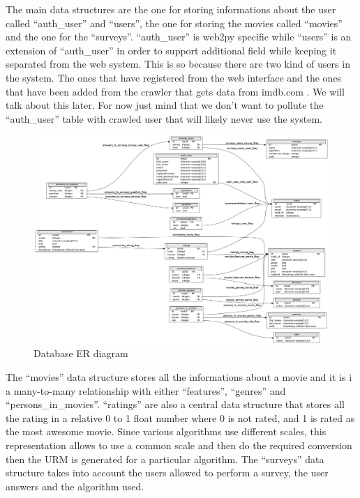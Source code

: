 The main data structures are the one for storing informations about the user called ``auth\_user'' and ``users'', the one for storing the movies called ``movies'' and the one for the ``surveys''. ``auth\_user'' is web2py specific while ``users'' is an extension of ``auth\_user'' in order to support additional field while keeping it separated from the web system. This is so because there are two kind of users in the system. The ones that have registered from the web interface and the ones that have been added from the crawler that gets data from imdb.com \cite{imdb}. We will talk about this later. For now just mind that we don't want to pollute the ``auth\_user'' table with crawled user that will likely never use the system.

\begin{figure}
  \centering
  \includegraphics[height=0.7\textheight, angle=90]{figures/db_er.png}
  \caption{Database ER diagram}
  \label{fig:db_er}
\end{figure}

The ``movies'' data structure stores all the informations about a movie and it is i a many-to-many relationship with either ``features'', ``genres'' and ``persons\_in\_movies''. ``ratings'' are also a central data structure that stores all the rating in a relative 0 to 1 float number where 0 is not rated, and 1 is rated as the most awesome movie. Since various algorithms use different scales, this representation allows to use a common scale and then do the required conversion then the \ac{URM} is generated for a particular algorithm.
The ``surveys'' data structure takes into account the users allowed to perform a survey, the user answers and the algorithm used.


